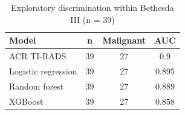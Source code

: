 \begin{table}[htbp]
\caption{Exploratory discrimination within Bethesda III (n = 39)}\label{tab:s4_bethesda_iii}
\scriptsize
\begin{tabular*}{\textwidth}{@{\extracolsep{\fill}}lccc@{}}
\toprule
Model & n & Malignant & AUC \\
\midrule
ACR TI-RADS & 39 & 27 & 0.9 \\
Logistic regression & 39 & 27 & 0.895 \\
Random forest & 39 & 27 & 0.889 \\
XGBoost & 39 & 27 & 0.858 \\
\bottomrule
\end{tabular*}
\smallskip{}
\end{table}
